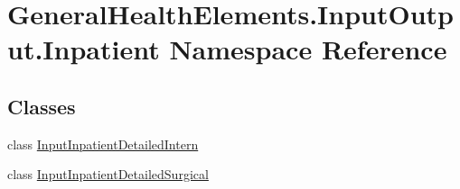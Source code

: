\hypertarget{namespace_general_health_elements_1_1_input_output_1_1_inpatient}{}\section{General\+Health\+Elements.\+Input\+Output.\+Inpatient Namespace Reference}
\label{namespace_general_health_elements_1_1_input_output_1_1_inpatient}
\subsection*{Classes}
\begin{DoxyCompactItemize}
\item 
class \hyperlink{class_general_health_elements_1_1_input_output_1_1_inpatient_1_1_input_inpatient_detailed_intern}{Input\+Inpatient\+Detailed\+Intern}
\item 
class \hyperlink{class_general_health_elements_1_1_input_output_1_1_inpatient_1_1_input_inpatient_detailed_surgical}{Input\+Inpatient\+Detailed\+Surgical}
\end{DoxyCompactItemize}

